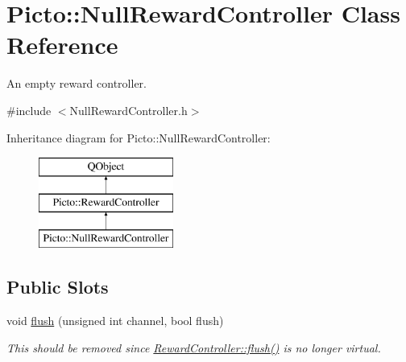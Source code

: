 \hypertarget{class_picto_1_1_null_reward_controller}{\section{Picto\-:\-:Null\-Reward\-Controller Class Reference}
\label{class_picto_1_1_null_reward_controller}
}


An empty reward controller.  




{\ttfamily \#include $<$Null\-Reward\-Controller.\-h$>$}

Inheritance diagram for Picto\-:\-:Null\-Reward\-Controller\-:\begin{figure}[H]
\begin{center}
\leavevmode
\includegraphics[height=3.000000cm]{class_picto_1_1_null_reward_controller}
\end{center}
\end{figure}
\subsection*{Public Slots}
\begin{DoxyCompactItemize}
\item 
\hypertarget{class_picto_1_1_null_reward_controller_ad9ef0c0e87816b12e0f54207df1ee690}{void \hyperlink{class_picto_1_1_null_reward_controller_ad9ef0c0e87816b12e0f54207df1ee690}{flush} (unsigned int channel, bool flush)}\label{class_picto_1_1_null_reward_controller_ad9ef0c0e87816b12e0f54207df1ee690}

\begin{DoxyCompactList}\small\item\em This should be removed since \hyperlink{class_picto_1_1_reward_controller_a82c6d50f2c4d7b924691090e7f8d4781}{Reward\-Controller\-::flush()} is no longer virtual. \end{DoxyCompactList}\end{DoxyCompactItemize}
